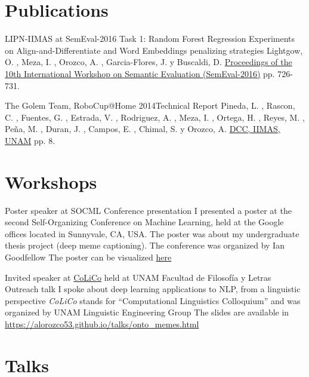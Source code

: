 \documentclass[11pt,a4paper,sans]{moderncv} %
\begin{document}
\section{Publications}

        {LIPN-IIMAS at SemEval-2016 Task 1: Random Forest Regression Experiments on Align-and-Differentiate and Word Embeddings penalizing strategies}
        {}{}{}
        {Lightgow, O. , Meza, I. , Orozco, A. , Garcia-Flores, J. y Buscaldi, D.
         \href{https://www.aclweb.org/anthology/S/S16/S16-1112.pdf}{Proceedings of the 10th International Workshop on Semantic Evaluation (SemEval-2016)} pp. 726-731.}

        {The Golem Team, RoboCup@Home 2014}{Technical Report}
        {}{}
        {Pineda, L. , Rascon, C. , Fuentes, G. , Estrada, V. , Rodriguez, A. , Meza, I. , Ortega, H. ,
         Reyes, M. , Peña, M. , Duran, J. , Campos, E. , Chimal, S. y Orozco, A.
        \href{http://golem.iimas.unam.mx/pubs/tdp_Golem-II+_2014.pdf}{DCC, IIMAS, UNAM} pp. 8.}

\section{Workshops}

        {Poster speaker at SOCML}
        {Conference presentation}
        {I presented a poster at the second Self-Organizing Conference on Machine Learning, held at the Google offices located in Sunnyvale, CA, USA. The poster was about my undergraduate thesis project (deep meme captioning). The conference was organized by Ian Goodfellow}
        {The poster can be visualized \href{https://drive.google.com/file/d/1DPjqiXcmliwPZBOfBIXxnIX_rs9EPUub/view?usp=sharing}{here}}
        {}

        {Invited speaker at \href{http://www.corpus.unam.mx/colico/VIIICoLiCo.html}{CoLiCo} held at UNAM Facultad de Filosofía y Letras}
        {Outreach talk}
        {I spoke about deep learning applications to NLP, from a linguistic perspective}
        {\emph{CoLiCo} stands for ``Computational Linguistics Colloquium'' and was organized by UNAM Linguistic Engineering Group}
        {The slides are available in \url{https://alorozco53.github.io/talks/onto_memes.html}}


\section{Talks}
\end{document}
